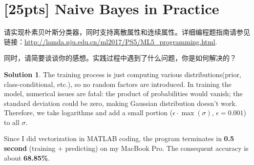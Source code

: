 \documentclass[a4paper,UTF8]{article}
\numberwithin{equation}{section}
\theoremstyle{definition}
\newtheorem*{solution}{Solution}
\begin{document}
\section{[25pts] Naive Bayes in Practice}
请实现朴素贝叶斯分类器，同时支持离散属性和连续属性。详细编程题指南请参见链接：\url{http://lamda.nju.edu.cn/ml2017/PS5/ML5_programming.html}. 

同时，请简要谈谈你的感想。实践过程中遇到了什么问题，你是如何解决的？
\begin{solution}
The training process is just computing various distributions(prior, class-conditional, etc.), so no random factors are introduced. In training the model, numerical issues are fatal: the product of probabilities would vanish; the standard deviation could be zero, making Gaussian distribution doesn't work. Therefore, we take logarithms and add a small portion ($\epsilon\cdot \max(\sigma)$, $\epsilon=0.001$) to all $\sigma$. 

Since I did vectorization in MATLAB coding, the program terminates in \textbf{0.5 second} (training + predicting) on my MacBook Pro. The consequent accuracy is about \textbf{68.85\%}. 
~\\
\end{solution}
\end{document}
